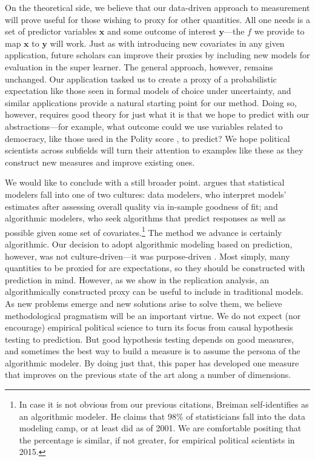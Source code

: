 On the theoretical side, we believe that our data-driven approach to measurement will prove useful for those wishing to proxy for other quantities. 
All one needs is a set of predictor variables $\boldsymbol{x}$ and some outcome of interest $\boldsymbol{y}$---the $f$ we provide to map $\boldsymbol{x}$ to $\boldsymbol{y}$ will work. 
Just as with introducing new covariates in any given application, future scholars can improve their proxies by including new models for evaluation in the super learner. 
The general approach, however, remains unchanged. 
Our application tasked us to create a proxy of a probabilistic expectation like those seen in formal models of choice under uncertainty, and similar applications provide a natural starting point for our method. 
Doing so, however, requires good theory for just what it is that we hope to predict with our abstractions---for example, what outcome could we use variables related to democracy, like those used in the Polity score \citep{marshall2014}, to predict? 
We hope political scientists across subfields will turn their attention to examples like these as they construct new measures and improve existing ones.

We would like to conclude with a still broader point. 
\citet{Breiman:2001fd} argues that statistical modelers fall into one of two cultures: data modelers, who interpret models' estimates after assessing overall quality via in-sample goodness of fit; and algorithmic modelers, who seek algorithms that predict responses as well as possible given some set of covariates.\footnote{
  In case it is not obvious from our previous citations, Breiman self-identifies as an algorithmic modeler.
  He claims that 98\% of statisticians fall into the data modeling camp, or at least did as of 2001.
  We are comfortable positing that the percentage is similar, if not greater, for empirical political scientists in 2015.
} 
The method we advance is certainly algorithmic. 
Our decision to adopt algorithmic modeling based on prediction, however, was not culture-driven---it was purpose-driven \citep{clarke2012}. 
Most simply, many quantities to be proxied for are expectations, so they should be constructed with prediction in mind. 
However, as we show in the replication analysis, an algorithmically constructed proxy can be useful to include in traditional models.
As new problems emerge and new solutions arise to solve them, we believe methodological pragmatism will be an important virtue.
We do not expect (nor encourage) empirical political science to turn its focus from causal hypothesis testing to prediction.
But good hypothesis testing depends on good measures, and sometimes the best way to build a measure is to assume the persona of the algorithmic modeler.
By doing just that, this paper has developed one measure that improves on the previous state of the art along a number of dimensions.

